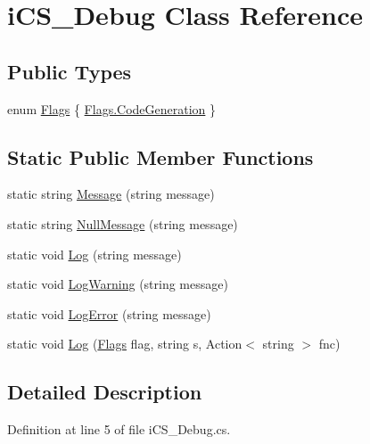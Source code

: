 \hypertarget{classi_c_s___debug}{\section{i\+C\+S\+\_\+\+Debug Class Reference}
\label{classi_c_s___debug}
}
\subsection*{Public Types}
\begin{DoxyCompactItemize}
\item 
enum \hyperlink{classi_c_s___debug_a0d3cf4afa05342df5a1e3a89538a0f9d}{Flags} \{ \hyperlink{classi_c_s___debug_a0d3cf4afa05342df5a1e3a89538a0f9da8677c4b99028a894235c65bf9730b56d}{Flags.\+Code\+Generation}
 \}
\end{DoxyCompactItemize}
\subsection*{Static Public Member Functions}
\begin{DoxyCompactItemize}
\item 
static string \hyperlink{classi_c_s___debug_af0dece3ffe206a90026b263b5a6682e9}{Message} (string message)
\item 
static string \hyperlink{classi_c_s___debug_a94796b5ba8d86e0f5af8dca17767e4f2}{Null\+Message} (string message)
\item 
static void \hyperlink{classi_c_s___debug_a3cc41ea3ad1027c9c6385a388b2eba88}{Log} (string message)
\item 
static void \hyperlink{classi_c_s___debug_af6837bbc64f9392d332e463c63f51a44}{Log\+Warning} (string message)
\item 
static void \hyperlink{classi_c_s___debug_a1c4a858500d854fc9fedc15ff155add9}{Log\+Error} (string message)
\item 
static void \hyperlink{classi_c_s___debug_a1f3cfd87e98cd80af2bb88cf8eb96001}{Log} (\hyperlink{classi_c_s___debug_a0d3cf4afa05342df5a1e3a89538a0f9d}{Flags} flag, string s, Action$<$ string $>$ fnc)
\end{DoxyCompactItemize}


\subsection{Detailed Description}


Definition at line 5 of file i\+C\+S\+\_\+\+Debug.\+cs.



